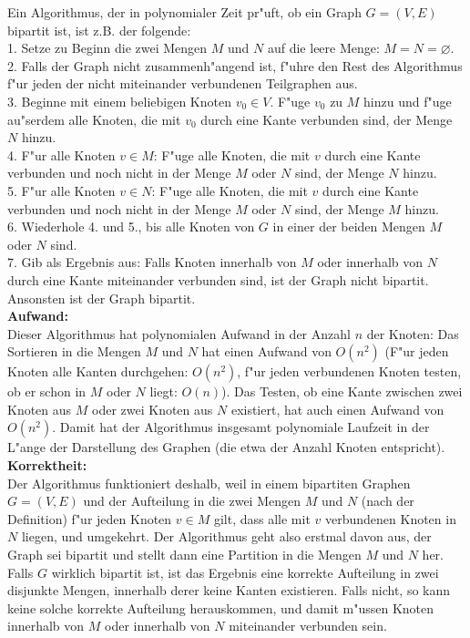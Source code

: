 \documentclass[10pt,oneside,onecolumn,a4paper,german,titlepage]{article}
\begin{document}
\newpage

Ein Algorithmus, der in polynomialer Zeit pr"uft, ob ein Graph $G = (V, E)$ bipartit
ist, ist z.B. der folgende:\\[4pt]
1. Setze zu Beginn die zwei Mengen $M$ und $N$ auf die leere Menge: $M = N =
\varnothing$.\\
2. Falls der Graph nicht zusammenh"angend ist, f"uhre den Rest des Algorithmus f"ur
jeden der nicht miteinander verbundenen Teilgraphen aus.\\
3. Beginne mit einem beliebigen Knoten $v_0 \in V$. F"uge $v_0$ zu $M$ hinzu und
f"uge au"serdem alle Knoten, die mit $v_0$ durch eine Kante verbunden sind, der
Menge $N$ hinzu.\\
4. F"ur alle Knoten $v \in M$: F"uge alle Knoten, die mit $v$ durch eine Kante
verbunden und noch nicht in der Menge $M$ oder $N$ sind, der Menge $N$ hinzu.\\
5. F"ur alle Knoten $v \in N$: F"uge alle Knoten, die mit $v$ durch eine Kante
verbunden und noch nicht in der Menge $M$ oder $N$ sind, der Menge $M$ hinzu.\\
6. Wiederhole 4. und 5., bis alle Knoten von $G$ in einer der beiden Mengen $M$
oder $N$ sind.\\
7. Gib als Ergebnis aus: Falls Knoten innerhalb von $M$ oder innerhalb von $N$
durch eine Kante miteinander verbunden sind, ist der Graph nicht bipartit.
Ansonsten ist der Graph bipartit.\\[4pt]
\textbf{Aufwand:}\\
Dieser Algorithmus hat polynomialen Aufwand in der Anzahl $n$ der Knoten: Das
Sortieren in die Mengen $M$ und $N$ hat einen Aufwand von $O(n^2)$ (F"ur jeden
Knoten alle Kanten durchgehen: $O(n^2)$, f"ur jeden verbundenen Knoten testen,
ob er schon in $M$ oder $N$ liegt: $O(n)$). Das Testen, ob eine Kante zwischen
zwei Knoten aus $M$ oder zwei Knoten aus $N$ existiert, hat auch einen Aufwand
von $O(n^2)$. Damit hat der Algorithmus insgesamt polynomiale Laufzeit in der
L"ange der Darstellung des Graphen (die etwa der Anzahl Knoten entspricht).\\[4pt]
\textbf{Korrektheit:}\\
Der Algorithmus funktioniert deshalb, weil in einem bipartiten Graphen $G = (V,E)$
und der Aufteilung in die zwei Mengen $M$ und $N$ (nach der Definition) f"ur jeden
Knoten $v \in M$ gilt, dass alle mit $v$ verbundenen Knoten in $N$ liegen, und
umgekehrt. Der Algorithmus geht also erstmal davon aus, der Graph sei bipartit
und stellt dann eine Partition in die Mengen $M$ und $N$ her. Falls $G$ wirklich
bipartit ist, ist das Ergebnis eine korrekte Aufteilung in zwei disjunkte Mengen,
innerhalb derer keine Kanten existieren. Falls nicht, so kann keine solche korrekte
Aufteilung herauskommen, und damit m"ussen Knoten innerhalb von $M$ oder innerhalb
von $N$ miteinander verbunden sein.
\end{document}
